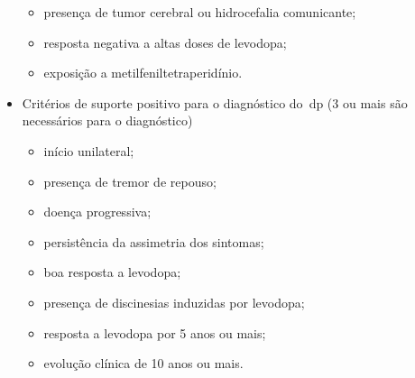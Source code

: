 \begin{itemize}
\begin{itemize}
			\item presença de tumor cerebral ou hidrocefalia comunicante;
			\item resposta negativa a altas doses de levodopa;
			\item exposição a metilfeniltetraperidínio.
		\end{itemize}
	\item Critérios de suporte positivo para o diagnóstico do~\ac{dp} (3 ou mais são necessários para o diagnóstico)
		\begin{itemize}
			\item início unilateral;
			\item presença de tremor de repouso;
			\item doença progressiva;
			\item persistência da assimetria dos sintomas;
			\item boa resposta a levodopa;
			\item presença de discinesias induzidas por levodopa;
			\item resposta a levodopa por 5 anos ou mais;
			\item evolução clínica de 10 anos ou mais.
		\end{itemize}
\end{itemize}
